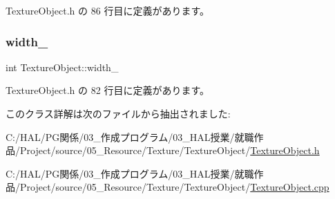  Texture\+Object.\+h の 86 行目に定義があります。

\mbox{\label{class_texture_object_a8e3d1b2b233672e0ea161b21d9c1cae0}} 
\subsubsection{\texorpdfstring{width\+\_\+}{width\_}}
{\footnotesize\ttfamily int Texture\+Object\+::width\+\_\+\hspace{0.3cm}{\ttfamily [private]}}



 Texture\+Object.\+h の 82 行目に定義があります。



このクラス詳解は次のファイルから抽出されました\+:\begin{DoxyCompactItemize}
\item 
C\+:/\+H\+A\+L/\+P\+G関係/03\+\_\+作成プログラム/03\+\_\+\+H\+A\+L授業/就職作品/\+Project/source/05\+\_\+\+Resource/\+Texture/\+Texture\+Object/\mbox{\hyperlink{_texture_object_8h}{Texture\+Object.\+h}}\item 
C\+:/\+H\+A\+L/\+P\+G関係/03\+\_\+作成プログラム/03\+\_\+\+H\+A\+L授業/就職作品/\+Project/source/05\+\_\+\+Resource/\+Texture/\+Texture\+Object/\mbox{\hyperlink{_texture_object_8cpp}{Texture\+Object.\+cpp}}\end{DoxyCompactItemize}
